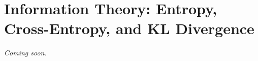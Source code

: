 \chapter{Information Theory: Entropy, Cross-Entropy, and KL Divergence}
\label{chap:ch10}

\textit{Coming soon.}
